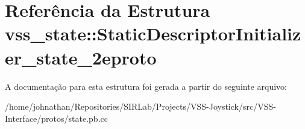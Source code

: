 \hypertarget{structvss__state_1_1StaticDescriptorInitializer__state__2eproto}{}\section{Referência da Estrutura vss\+\_\+state\+:\+:Static\+Descriptor\+Initializer\+\_\+state\+\_\+2eproto}
\label{structvss__state_1_1StaticDescriptorInitializer__state__2eproto}


A documentação para esta estrutura foi gerada a partir do seguinte arquivo\+:\begin{DoxyCompactItemize}
\item 
/home/johnathan/\+Repositories/\+S\+I\+R\+Lab/\+Projects/\+V\+S\+S-\/\+Joystick/src/\+V\+S\+S-\/\+Interface/protos/state.\+pb.\+cc\end{DoxyCompactItemize}
